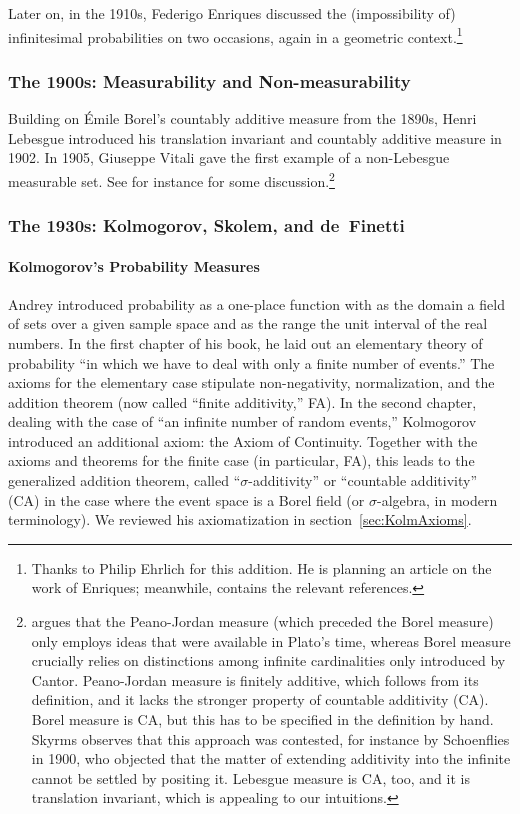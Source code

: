 Later on, in the 1910s, Federigo Enriques discussed the (impossibility of) infinitesimal probabilities on two occasions, again in a geometric context.\footnote{Thanks to Philip Ehrlich for this addition. He is planning an article on the work of Enriques; meanwhile, \citet{Ehrlich:2006} contains the relevant references.}

\subsubsection*{The 1900s: Measurability and Non-measurability}
Building on {\'E}mile Borel's countably additive measure from the 1890s, Henri Lebesgue introduced his translation invariant and countably additive measure in 1902. In 1905, Giuseppe Vitali gave the first example of a non-Lebesgue measurable set. See for instance \citet{Skyrms:1983a} for some discussion.\footnote{\citet{Skyrms:1983a} argues that the Peano-Jordan measure (which preceded the Borel measure) only employs ideas that were available in Plato's time, whereas Borel measure crucially relies on distinctions among infinite cardinalities only introduced by Cantor. Peano-Jordan measure is finitely additive, which follows from its definition, and it lacks the stronger property of countable additivity (CA). Borel measure is CA, but this has to be specified in the definition by hand. Skyrms observes that this approach was contested, for instance by Schoenflies in 1900, who objected that the matter of extending additivity into the infinite cannot be settled by positing it. Lebesgue measure is CA, too, and it is translation invariant, which is appealing to our intuitions.\label{fn:Schoenflies}}

\subsubsection*{The 1930s: Kolmogorov, Skolem, and de~Finetti}

\paragraph{Kolmogorov's Probability Measures}\label{sec:Kolmogorov}
Andrey \citet{Kolmogorov:1933} introduced probability as a one-place function with as the domain a field of sets over a given sample space and as the range the unit interval of the real numbers. In the first chapter of his book, he laid out an elementary theory of probability ``in which we have to deal with only a finite number of events.'' The axioms for the elementary case stipulate non-negativity, normalization, and the addition theorem (now called ``finite additivity,'' FA).
In the second chapter, dealing with the case of ``an infinite number of random events,'' Kolmogorov introduced an additional axiom: the Axiom of Continuity. Together with the axioms and theorems for the finite case (in particular, FA), this leads to the generalized addition theorem, called ``$\sigma $-additivity'' or ``countable additivity'' (CA) in the case where the event space is a Borel field (or $\sigma $-algebra, in modern terminology). We reviewed his axiomatization in section~\ref{sec:KolmAxioms}.

